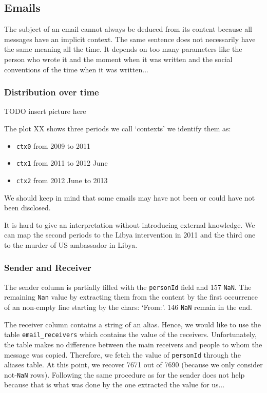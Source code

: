 \documentclass[11pt]{article}
\begin{document}
\subsection{Emails}

The subject of an email cannot always be deduced from its content because all messages have an implicit context. The same sentence does not necessarily have the same meaning all the time. It depends on too many parameters like the person who wrote it and the moment when it was written and the social conventions of the time when it was written...

\subsubsection{Distribution over time}

TODO insert picture here

The plot XX shows three periods we call `contexts' we identify them as:

\begin{itemize}
    \item \texttt{ctx0} from 2009 to 2011
    \item \texttt{ctx1} from 2011 to 2012 June
    \item \texttt{ctx2} from 2012 June to 2013
\end{itemize}

We should keep in mind that some emails may have not been or could have not been disclosed.

It is hard to give an interpretation without introducing external knowledge. We can map the second periods to the Libya intervention in 2011 and the third one to the murder of US ambassador in Libya.

\subsubsection{Sender and Receiver}

The sender column is partially filled with the \texttt{personId} field and 157 \texttt{NaN}. The remaining \texttt{Nan} value by extracting them from the content by the first occurrence of an non-empty line starting by the chars: `From:'. 146 \texttt{NaN} remain in the end.

The receiver column contains a string of an alias. Hence, we would like to use the table \texttt{email\_receivers} which contains the value of the receivers. Unfortunately, the table makes no difference between the main receivers and people to whom the message was copied. Therefore, we fetch the value of \texttt{personId} through the aliases table.  At this point, we recover 7671 out of 7690 (because we only consider not-\texttt{NaN} rows). Following the same procedure as for the sender does not help because that is what was done by the one extracted the value for us...
\end{document}
